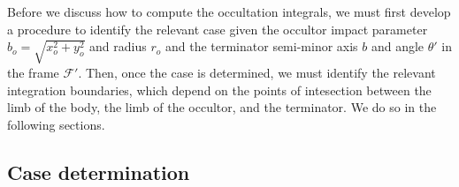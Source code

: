 \documentclass[modern]{aastex62}
\begin{document}

Before we discuss how to compute the occultation integrals, we must first
develop a procedure to identify the relevant case given the occultor
impact parameter $b_o = \sqrt{x_o^2 + y_o^2}$ and radius $r_o$ and
the terminator semi-minor
axis $b$ and angle $\theta'$ in the frame $\mathcal{F}'$.
Then, once the case is determined, we must
identify the relevant integration boundaries, which depend on the points
of intesection between the limb of the body, the limb of the occultor, and
the terminator. We do so in the following sections.

%

\subsection{Case determination}
\label{sec:which-case}
\end{document}
